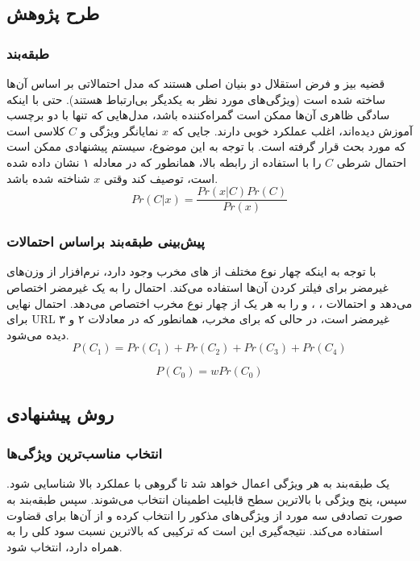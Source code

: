 \documentclass{CSICC2020}
\begin{document}
	\subsection{طرح پژوهش}
	\subsubsection{
	طبقه‌بند  }
	قضیه بیز و فرض استقلال دو بنیان اصلی هستند که مدل احتمالاتی  بر اساس آن‌ها ساخته شده است (ویژگی‌های مورد نظر به یکدیگر بی‌ارتباط هستند). حتی با اینکه سادگی ظاهری آن‌ها ممکن است گمراه‌کننده باشد، مدل‌هایی که تنها با دو برچسب آموزش دیده‌اند، اغلب عملکرد خوبی دارند. جایی که $x$ نمایانگر ویژگی و $C$ کلاسی است که مورد بحث قرار گرفته است. با توجه به این موضوع، سیستم پیشنهادی ممکن است احتمال شرطی $C$ را با استفاده از رابطه بالا، همانطور که در معادله ۱ نشان داده شده است، توصیف کند وقتی $x$ شناخته شده باشد.
	\begin{equation}
		Pr(C | x) = \frac{Pr(x | C)Pr(C)}{Pr(x)}
		\label{eq:bayes}
	\end{equation}
	
	\subsubsection{
		پیش‌بینی طبقه‌بند   براساس احتمالات}
	با توجه به اینکه چهار نوع مختلف از های مخرب وجود دارد، نرم‌افزار از وزن‌های غیرمضر برای فیلتر کردن آن‌ها استفاده می‌کند.  احتمال  را به یک  غیرمضر اختصاص می‌دهد و احتمالات ، ،  و  را به هر یک از چهار نوع  مخرب اختصاص می‌دهد. احتمال نهایی برای URL غیرمضر  است، در حالی که برای  مخرب،  همانطور که در معادلات ۲ و ۳ دیده می‌شود.
	\begin{equation}
		P(C_1) = Pr(C_1) + Pr(C_2) + Pr(C_3) + Pr(C_4)
		\label{eq:probsum}
	\end{equation}
	
	\begin{equation}
		P(C_0) = wPr(C_0)
		\label{eq:scaledprob}
	\end{equation}
	
	\subsection{روش پیشنهادی}
	\subsubsection{انتخاب مناسب‌ترین ویژگی‌ها}
	یک طبقه‌بند  به هر ویژگی اعمال خواهد شد تا گروهی با عملکرد بالا شناسایی شود. سپس، پنج ویژگی با بالاترین سطح قابلیت اطمینان انتخاب می‌شوند. سپس طبقه‌بند  به صورت تصادفی سه مورد از ویژگی‌های مذکور را انتخاب کرده و از آن‌ها برای قضاوت استفاده می‌کند. نتیجه‌گیری این است که ترکیبی که بالاترین نسبت سود کلی را به همراه دارد، انتخاب شود.
\end{document}
